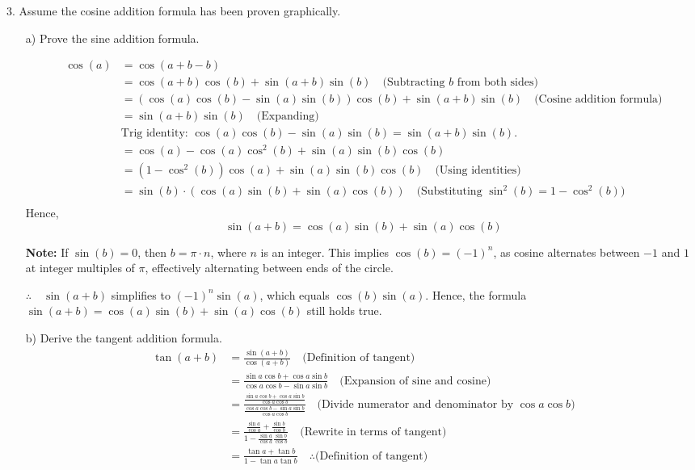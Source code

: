 \documentclass{article}
\newenvironment{solution}{\color{solutioncolor}}{}
\begin{document}
3. Assume the cosine addition formula has been proven graphically.
\begin{enumerate}
    \item[a)] Prove the sine addition formula.
    \begin{solution}

    \begin{align*}
        \cos(a) &= \cos(a + b - b) \\
        &= \cos(a + b)\cos(b) + \sin(a + b)\sin(b) \quad \text{(Subtracting $b$ from both sides)} \\
        &= (\cos(a)\cos(b) - \sin(a)\sin(b))\cos(b) + \sin(a + b)\sin(b) \quad \text{(Cosine addition formula)}\\
        &= \sin(a + b)\sin(b) \quad \text{(Expanding)} \\
        &\text{Trig identity: $\cos(a)\cos(b) - \sin(a)\sin(b) = \sin(a + b)\sin(b)$.}\\
        &= \cos(a) - \cos(a)\cos^2(b) + \sin(a)\sin(b)\cos(b) \\
        &= (1 - \cos^2(b))\cos(a) + \sin(a)\sin(b)\cos(b) \quad \text{(Using identities)} \\
        &= \sin(b) \cdot (\cos(a)\sin(b) + \sin(a)\cos(b)) \quad \text{(Substituting $\sin^2(b) = 1 - \cos^2(b)$)} \\
    \end{align*}
    Hence, 
    \[
    \sin(a + b) = \cos(a)\sin(b) + \sin(a)\cos(b)
    \]

\textbf{Note:} If $\sin(b) = 0$, then $b = \pi \cdot n$, where $n$ is an integer. This implies $\cos(b) = (-1)^n$, as cosine alternates between $-1$ and $1$ at integer multiples of $\pi$, effectively alternating between ends of the circle. 

 $\therefore \quad \sin(a + b)$ simplifies to $(-1)^n \sin(a)$, which equals $\cos(b) \sin(a)$. Hence, the formula $\sin(a + b) = \cos(a)\sin(b) + \sin(a)\cos(b)$ still holds true.



    \end{solution}

    \item[b)] Derive the tangent addition formula.
    \begin{solution}
\begin{align*}
    \tan(a + b) &= \frac{\sin(a + b)}{\cos(a + b)} \quad \text{(Definition of tangent)} \\
    &= \frac{\sin a \cos b + \cos a \sin b}{\cos a \cos b - \sin a \sin b} \quad \text{(Expansion of sine and cosine)} \\
    &= \frac{\frac{\sin a \cos b + \cos a \sin b}{\cos a \cos b}}{\frac{\cos a \cos b - \sin a \sin b}{\cos a \cos b}} \quad \text{(Divide numerator and denominator by } \cos a \cos b) \\
    &= \frac{\frac{\sin a}{\cos a} + \frac{\sin b}{\cos b}}{1 - \frac{\sin a}{\cos a} \frac{\sin b}{\cos b}} \quad \text{(Rewrite in terms of tangent)} \\
    &= \frac{\tan a + \tan b}{1 - \tan a \tan b} \quad \therefore\text{(Definition of tangent)}
\end{align*}


\end{solution}
\end{enumerate}
\end{document}
